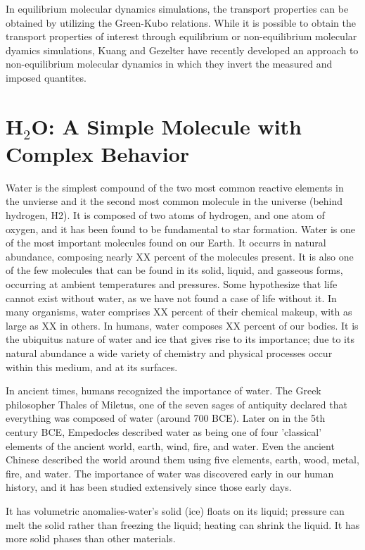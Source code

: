 In equilibrium molecular dynamics simulations, the transport
properties can be obtained by utilizing the Green-Kubo relations.
While it is possible to obtain the transport properties of interest
through equilibrium or non-equilibrium molecular dyamics simulations,
Kuang and Gezelter have recently developed an approach to
non-equilibrium molecular dynamics in which they invert the measured
and imposed quantites.


\section{H$_2$O: A Simple Molecule with Complex Behavior}
Water is the simplest compound of the two most common reactive
elements in the unvierse and it the second most common molecule in the
universe (behind hydrogen, H2). It is composed of two atoms of
hydrogen, and one atom of oxygen, and it has been found to be
fundamental to star formation.  Water is one of the most important
molecules found on our Earth.  It occurrs in natural abundance,
composing nearly XX percent of the molecules present. It is also one
of the few molecules that can be found in its solid, liquid, and
gasseous forms, occurring at ambient temperatures and pressures.  Some
hypothesize that life cannot exist without water, as we have not found
a case of life without it. In many organisms, water comprises XX
percent of their chemical makeup, with as large as XX in others. In
humans, water composes XX percent of our bodies. It is the ubiquitus
nature of water and ice that gives rise to its importance; due to its
natural abundance a wide variety of chemistry and physical processes
occur within this medium, and at its surfaces.

In ancient times, humans recognized the importance of water. The Greek
philosopher Thales of Miletus, one of the seven sages of antiquity
declared that everything was composed of water (around 700 BCE). Later
on in the 5th century BCE, Empedocles described water as being one of
four 'classical' elements of the ancient world, earth, wind, fire, and
water. Even the ancient Chinese described the world around them using
five elements, earth, wood, metal, fire, and water. The importance of
water was discovered early in our human history, and it has been
studied extensively since those early days.  

It has volumetric anomalies-water’s solid (ice) floats on its liquid;
pressure can melt the solid rather than freezing the liquid; heating
can shrink the liquid. It has more solid phases than other materials.

